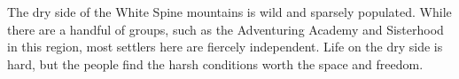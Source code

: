 The dry side of the White Spine mountains is wild and sparsely populated.
While there are a handful of groups, such as the Adventuring Academy and Sisterhood in this region, most settlers here are fiercely independent.
Life on the dry side is hard, but the people find the harsh conditions worth the space and freedom.
